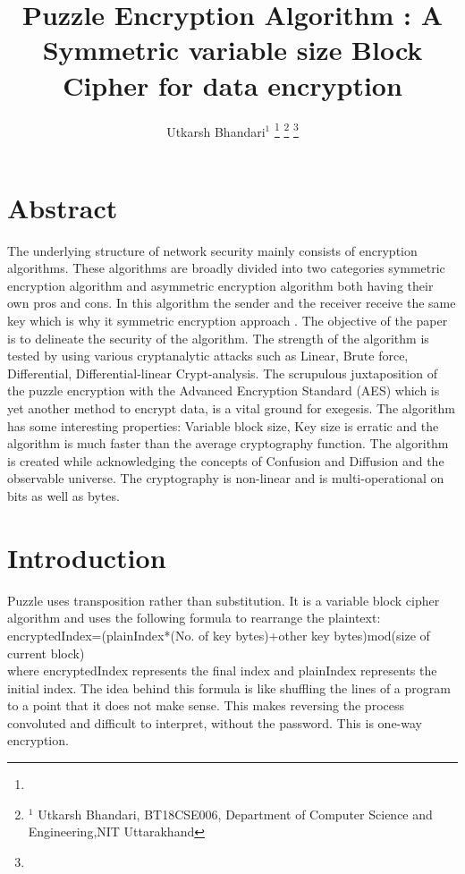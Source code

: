 \documentclass[letterpaper, 12 pt, conference]{ieeeconf}  %
\title{\LARGE \bf
Puzzle Encryption Algorithm : A Symmetric
variable size Block Cipher for data encryption
}
\author{Utkarsh Bhandari$^{1}$ %
\thanks{}%
\thanks{$^{1}$ Utkarsh Bhandari, BT18CSE006, Department of Computer Science and Engineering,NIT Uttarakhand}%
\thanks{}%
}
\begin{document}
\maketitle
\section{Abstract}
The underlying structure of network security mainly consists of encryption algorithms. These algorithms are broadly divided into two categories symmetric encryption algorithm and asymmetric encryption algorithm both having their own pros and cons. In this algorithm the sender and the receiver receive the same key which is why it symmetric encryption approach . The objective of the paper is to delineate the security of the algorithm. The strength of the algorithm is tested by using various cryptanalytic attacks such as  Linear, Brute force, Differential, Differential-linear Crypt-analysis.
The scrupulous juxtaposition of the puzzle encryption with the Advanced Encryption Standard (AES) which is yet another method to encrypt data, is a vital ground for exegesis.  
The algorithm has some interesting properties: Variable block size, Key size is erratic and the algorithm is much faster than the average cryptography function. The algorithm is created while acknowledging the concepts of Confusion and Diffusion and the observable universe.
The cryptography is non-linear and is multi-operational on bits as well as bytes.

\section{Introduction}
Puzzle uses transposition rather than substitution. It is a variable block cipher algorithm and uses the following formula to rearrange the plaintext:
\\encryptedIndex=(plainIndex*(No. of key bytes)+other key bytes)mod(size of current block)\\
where encryptedIndex represents the final index and plainIndex represents the initial  index.
The idea behind this formula is like shuffling the lines of a program to a point that it does not make sense. This makes reversing the process convoluted and difficult to interpret, without the password. This is one-way encryption.\\ 
\end{document}
